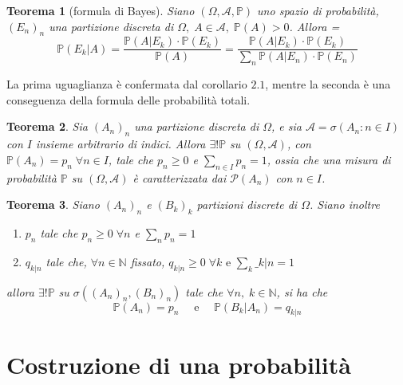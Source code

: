 \documentclass[a4paper,12pt]{article}
\theoremstyle{break}
\newtheorem{theorem}{Teorema}[section]
\numberwithin{equation}{section}
\begin{document}
\begin{theorem}[formula di Bayes]
  Siano \((\Omega, \mathcal{A}, \mathbb{P})\) uno spazio di probabilità, \((E_n)_n\) una partizione discreta di \(\Omega, \; A \in \mathcal{A}, \; \mathbb{P}(A) > 0\). Allora
  {\everymath = {\displaystyle}\[
    \mathbb{P}(E_k \vert A) = \frac{\mathbb{P}(A \vert E_k)\cdot \mathbb{P}(E_k)}{\mathbb{P}(A)} = \frac{\mathbb{P}(A\vert E_k) \cdot \mathbb{P}(E_k)}{\sum_n\mathbb{P}(A\vert E_n) \cdot \mathbb{P}(E_n)}
  \]}
\end{theorem}
La prima uguaglianza è confermata dal corollario \(2.1\), mentre la seconda è una conseguenza della formula delle probabilità totali.
\begin{theorem}
  Sia \((A_n)_n\) una partizione discreta di \(\Omega\), e sia \(\mathcal{A} = \sigma(A_n : n \in I)\) con \(I\) insieme arbitrario di indici. Allora \(\exists ! \mathbb{P}\) su \((\Omega, \mathcal{A})\), con \(\mathbb{P}(A_n) = p_n \; \forall n \in I\), tale che \(p_n \geq 0\) e \(\sum_{n \in I} p_n = 1\), ossia che una misura di probabilità \(\mathbb{P}\) su \((\Omega, \mathcal{A})\) è caratterizzata dai \(\mathcal{P}(A_n)\) con \(n \in I\). 
\end{theorem}
\begin{theorem}
  Siano \((A_n)_n\) e \((B_k)_k\) partizioni discrete di \(\Omega\). Siano inoltre 
  \begin{enumerate}
    \item \(p_n\) tale che \(p_n \geq 0 \; \forall n\) e \(\sum_n p_n = 1\)
    \item \(q_{k\vert n}\) tale che, \(\forall n \in \mathbb{N}\) fissato, \(q_{k \vert n} \geq 0 \; \forall k \mbox{ e } \sum_k \_{k \vert n} = 1\) 
  \end{enumerate}
  allora \(\exists ! \mathbb{P}\) su \(\sigma ((A_n)_n, (B_n)_n)\) tale che \(\forall n, \; k \in \mathbb{N}\), si ha che
  \[
    \mathbb{P}(A_n) = p_n \quad \mbox{ e } \quad \mathbb{P}(B_k \vert A_n) = q_{k\vert n}
  \]
\end{theorem}
\section{Costruzione di una probabilità}
\end{document}
